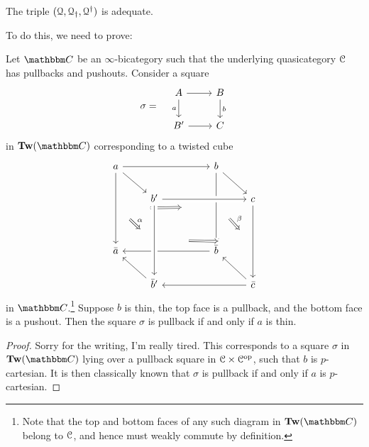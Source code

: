 \documentclass[main.tex]{subfiles}
\begin{document}
\begin{proposition}
  \label{prop:q_triple_is_adequate}
  The triple $(\mathcal{Q}, \mathcal{Q}_{\dagger}, \mathcal{Q}^{\dagger})$ is adequate.
\end{proposition}

To do this, we need to prove:
\begin{lemma}
  Let $\CC$ be an $\infty$-bicategory such that the underlying quasicategory $\mathcal{C}$ has pullbacks and pushouts. Consider a square
  \begin{equation*}
    \sigma =\quad
    \begin{tikzcd}
      A
      \arrow[r]
      \arrow[d, swap, "a"]
      & B
      \arrow[d, "b"]
      \\
      B'
      \arrow[r]
      & C
    \end{tikzcd}
  \end{equation*}
  in $\Tw(\CC)$ corresponding to a twisted cube
  \begin{equation*}
    \begin{tikzcd}
      a
      \arrow[rrr]
      \arrow[dr, ""{name=TL, right}]
      \arrow[ddd, ""{name=R1, right}]
      &&& b
      \arrow[ddd, ""{name=L2, left}, ""{name=R2, right}]
      \arrow[dr, ""{name=TR, left}]
      \arrow[from=R1, to=L2, Rightarrow, shorten=7ex]
      \\
      & b'
      \arrow[rrr, crossing over]
      &&& c
      \arrow[ddd, ""{name=L4, left}"]
      \\
      \\
      \bar{a}
      &&& \bar{b}
      \arrow[lll]
      \\
      & \bar{b}'
      \arrow[from=uuu, crossing over, ""{name=L3, left}, ""{name=R3, right}]
      \arrow[ul]
      &&& \bar{c}
      \arrow[lll]
      \arrow[ul]
      \arrow[from=R1, to=L3, Rightarrow, shorten=3ex, "\alpha"]
      \arrow[from=R3, to=L4, Rightarrow, crossing over, shorten=7ex]
      \arrow[from=R2, to=L4, Rightarrow, shorten=3ex, "\beta"]
    \end{tikzcd}
  \end{equation*}
  in $\CC$.\footnote{Note that the top and bottom faces of any such diagram in $\Tw(\CC)$ belong to $\mathcal{C}$, and hence must weakly commute by definition.} Suppose $b$ is thin, the top face is a pullback, and the bottom face is a pushout. Then the square $\sigma$ is pullback if and only if $a$ is thin.
\end{lemma}
\begin{proof}
  Sorry for the writing, I'm really tired. This corresponds to a square $\sigma$ in $\Tw(\CC)$ lying over a pullback square in $\mathcal{C} \times \mathcal{C}^{\mathrm{op}}$, such that $b$ is $p$-cartesian. It is then classically known that $\sigma$ is pullback if and only if $a$ is $p$-cartesian.
\end{proof}
\end{document}
